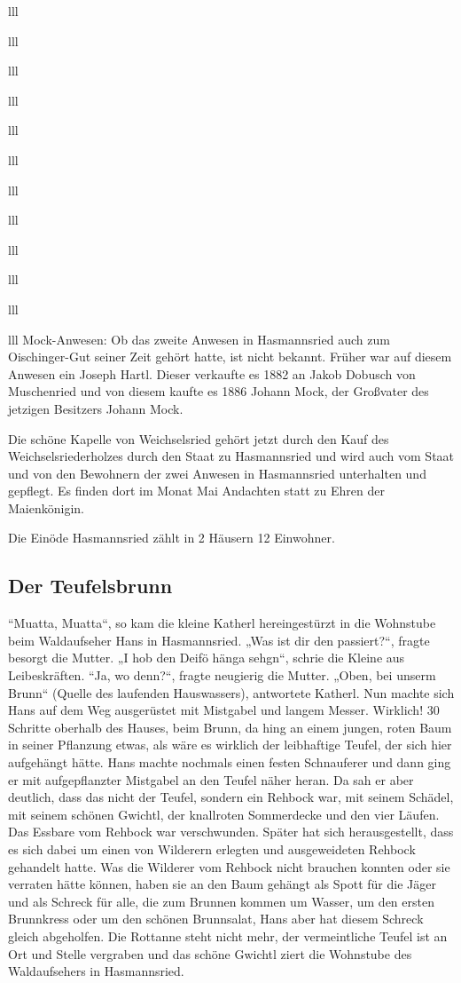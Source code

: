 \documentclass[12pt,a4pager]{book}
\begin{document}
\begin{tabuluar}{lll}
\begin{tabuluar}{lll}
\begin{tabuluar}{lll}
\begin{tabuluar}{lll}
\begin{tabuluar}{lll}
\begin{tabuluar}{lll}
\begin{tabuluar}{lll}
\begin{tabuluar}{lll}
\begin{tabuluar}{lll}
\begin{tabuluar}{lll}
\begin{tabuluar}{lll}
\begin{tabuluar}{lll}
Mock-Anwesen: Ob das zweite Anwesen in Hasmannsried auch zum Oischinger-Gut
seiner Zeit gehört hatte, ist nicht bekannt. Früher war auf diesem Anwesen ein
Joseph Hartl. Dieser verkaufte es 1882 an Jakob Dobusch von Muschenried und von
diesem kaufte es 1886 Johann Mock, der Großvater des jetzigen Besitzers Johann
Mock.

Die schöne Kapelle von Weichselsried gehört jetzt durch den Kauf des
Weichselsriederholzes durch den Staat zu Hasmannsried und wird auch vom Staat
und von den Bewohnern der zwei Anwesen in Hasmannsried unterhalten und gepflegt.
Es finden dort im Monat Mai Andachten statt zu Ehren der Maienkönigin.

Die Einöde Hasmannsried zählt in 2 Häusern 12 Einwohner.

\subsection{Der Teufelsbrunn}

“Muatta, Muatta“, so kam die kleine Katherl hereingestürzt in die Wohnstube beim
Waldaufseher Hans in Hasmannsried. „Was ist dir den passiert?“, fragte besorgt
die Mutter. „I hob den Deifö hänga sehgn“, schrie die Kleine aus Leibeskräften.
“Ja, wo denn?“, fragte neugierig die Mutter. „Oben, bei unserm Brunn“ (Quelle
des laufenden Hauswassers), antwortete Katherl. Nun machte sich Hans auf dem Weg
ausgerüstet mit Mistgabel und langem Messer. Wirklich! 30 Schritte oberhalb des
Hauses, beim Brunn, da hing an einem jungen, roten Baum in seiner Pflanzung
etwas, als wäre es wirklich der leibhaftige Teufel, der sich hier aufgehängt
hätte. Hans machte nochmals einen festen Schnauferer und dann ging er mit
aufgepflanzter Mistgabel an den Teufel näher heran. Da sah er aber deutlich,
dass das nicht der Teufel, sondern ein Rehbock war, mit seinem Schädel, mit
seinem schönen Gwichtl, der knallroten Sommerdecke und den vier Läufen. Das
Essbare vom Rehbock war verschwunden. Später hat sich herausgestellt, dass es
sich dabei um einen von Wilderern erlegten und ausgeweideten Rehbock gehandelt
hatte. Was die Wilderer vom Rehbock nicht brauchen konnten oder sie verraten
hätte können, haben sie an den Baum gehängt als Spott für die Jäger und als
Schreck für alle, die zum Brunnen kommen um Wasser, um den ersten Brunnkress
oder um den schönen Brunnsalat, Hans aber hat diesem Schreck gleich abgeholfen.
Die Rottanne steht nicht mehr, der vermeintliche Teufel ist an Ort und Stelle
vergraben und das schöne Gwichtl ziert die Wohnstube des Waldaufsehers in
Hasmannsried.


\end{tabuluar}
\end{tabuluar}
\end{tabuluar}
\end{tabuluar}
\end{tabuluar}
\end{tabuluar}
\end{tabuluar}
\end{tabuluar}
\end{tabuluar}
\end{tabuluar}
\end{tabuluar}
\end{tabuluar}
\end{document}
